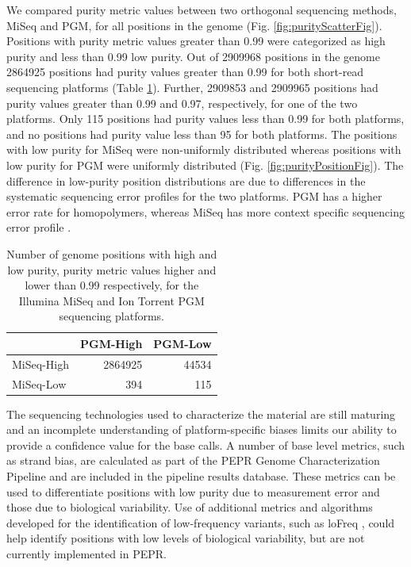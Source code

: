 \documentclass[smallextended]{svjour3}\usepackage[]{graphicx}\usepackage[]{color}
\begin{document}
We compared purity metric values between two orthogonal sequencing methods, MiSeq and PGM, for all positions in the genome (Fig. \ref{fig:purityScatterFig}). 
Positions with purity metric values greater than 0.99 were categorized as high purity and less than 0.99 low purity. 
Out of 2909968 positions in the genome 2864925 positions had purity values greater than 0.99 for both short-read sequencing platforms (Table \ref{Table:purityTable}). 
Further, 2909853 and 2909965 positions had purity values greater than 0.99 and 0.97, respectively, for one of the two platforms. 
Only 115 positions had purity values less than 0.99 for both platforms, and no positions had purity value less than 95 for both platforms. 
The positions with low purity for MiSeq were non-uniformly distributed whereas positions with low purity for PGM were uniformly distributed (Fig. \ref{fig:purityPositionFig}). The difference in low-purity position distributions are due to differences in the systematic sequencing error profiles for the two platforms.  PGM has a higher error rate for homopolymers, whereas MiSeq has more context specific sequencing error profile \cite{Quail2012}. 


\begin{table}[ht]
\centering
\begin{tabular}{lrr}
  \hline
  & PGM-High & PGM-Low \\ 
  \hline
MiSeq-High & 2864925 & 44534 \\ 
  MiSeq-Low & 394 & 115 \\ 
   \hline
\end{tabular}
\caption{Number of genome positions with high and low purity, purity metric values higher and lower than 0.99 respectively, for the Illumina MiSeq and Ion Torrent PGM sequencing platforms.} 
\label{Table:purityTable}
\end{table}



The sequencing technologies used to characterize the material are still maturing and an incomplete understanding of platform-specific biases limits our ability to provide a confidence value for the base calls. 
A number of base level metrics, such as strand bias, are calculated as part of the PEPR Genome Characterization Pipeline and are included in the pipeline results database. 
These metrics can be used to differentiate positions with low purity due to measurement error and those due to biological variability. 
Use of additional metrics and algorithms developed for the identification of low-frequency variants, such as loFreq \cite{Wilm2012}, could help identify positions with low levels of biological variability, but are not currently implemented in PEPR. 
\end{document}
